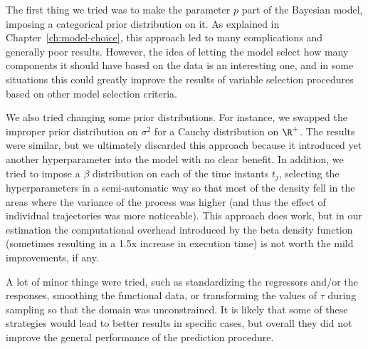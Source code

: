 The first thing we tried was to make the parameter \(p\) part of the Bayesian model, imposing a categorical prior distribution on it. As explained in Chapter~\ref{ch:model-choice}, this approach led to many complications and generally poor results. However, the idea of letting the model select how many components it should have based on the data is an interesting one, and in some situations this could greatly improve the results of variable selection procedures based on other model selection criteria.

We also tried changing some prior distributions. For instance, we swapped the improper prior distribution on \(\sigma^2\) for a Cauchy distribution on \(\R^+\). The results were similar, but we ultimately discarded this approach because it introduced yet another hyperparameter into the model with no clear benefit. In addition, we tried to impose a \(\beta\) distribution on each of the time instants \(t_j\), selecting the hyperparameters in a semi-automatic way so that most of the density fell in the areas where the variance of the process was higher (and thus the effect of individual trajectories was more noticeable). This approach does work, but in our estimation the computational overhead introduced by the beta density function (sometimes resulting in a 1.5x increase in execution time) is not worth the mild improvements, if any.

A lot of minor things were tried, such as standardizing the regressors and/or the responses, smoothing the functional data, or transforming the values of \(\tau\) during sampling so that the domain was unconstrained. It is likely that some of these strategies would lead to better results in specific cases, but overall they did not improve the general performance of the prediction procedure.
